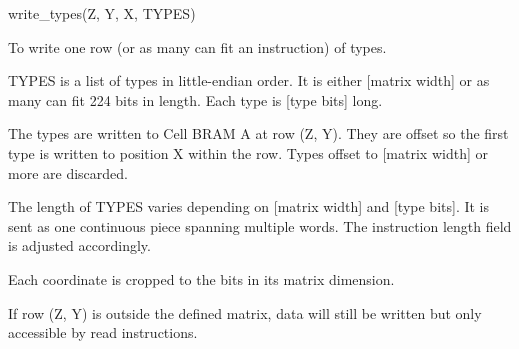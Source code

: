 

\format
write\_types(Z, Y, X, TYPES)

\purpose

To write one row (or as many can fit an instruction) of types.

\description

TYPES is a list of types in little-endian order.
It is either [matrix width] or as many can fit 224 bits in length.
Each type is [type bits] long.

The types are written to Cell BRAM A at row (Z, Y).
They are offset so the first type is written to position X within the row.
Types offset to [matrix width] or more are discarded.

The length of TYPES varies depending on [matrix width] and [type bits].
It is sent as one continuous piece spanning multiple words.
The instruction length field is adjusted accordingly.

\notes

Each coordinate is cropped to the bits in its matrix dimension.

If row (Z, Y) is outside the defined matrix, data will still be written but only accessible by read instructions.
